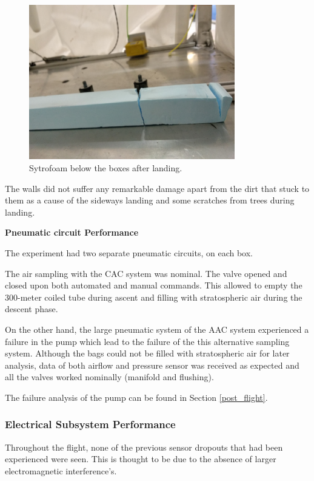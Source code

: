 \begin{figure}[H]
    \centering
    \includegraphics[width=0.8\textwidth]{7-data-analysis-and-results/img/Styrofoam_Post_Flight.jpg}
    \caption{Sytrofoam below the boxes after landing.}
    \label{fig:styrofoam_landing}
\end{figure}

The walls did not suffer any remarkable damage apart from the dirt that stuck to them as a cause of the sideways landing and some scratches from trees during landing. 


\textbf{Pneumatic circuit Performance}

\smallskip
The experiment had two separate pneumatic circuits, on each box. 

The air sampling with the CAC system was nominal. The valve opened and closed upon both automated and manual commands. This allowed to empty the 300-meter coiled tube during ascent and filling with stratospheric air during the descent phase.

On the other hand, the large pneumatic system of the AAC system experienced a failure in the pump which lead to the failure of the this alternative sampling system. Although the bags could not be filled with stratospheric air for later analysis, data of both airflow and pressure sensor was received as expected and all the valves worked nominally (manifold and flushing). 

The failure analysis of the pump can be found in Section \ref{post_flight}.

\subsubsection{Electrical Subsystem Performance}

Throughout the flight, none of the previous sensor dropouts that had been experienced were seen. This is thought to be due to the absence of larger electromagnetic interference's.

